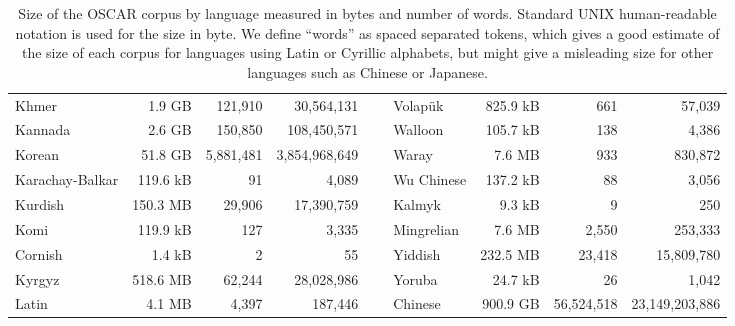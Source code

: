 \begin{table}[ht!]
{\begin{tabular}{lrrrclrrr}
            Khmer                       & 1.9 GB    & 121,910     & 30,564,131      & ~ & Volapük           & 825.9 kB  & 661        & 57,039         \\
            Kannada                     & 2.6 GB    & 150,850     & 108,450,571     & ~ & Walloon           & 105.7 kB  & 138        & 4,386          \\
            Korean                      & 51.8 GB   & 5,881,481   & 3,854,968,649   & ~ & Waray             & 7.6 MB    & 933        & 830,872        \\
            Karachay-Balkar             & 119.6 kB  & 91          & 4,089           & ~ & Wu Chinese        & 137.2 kB  & 88         & 3,056          \\
            Kurdish                     & 150.3 MB  & 29,906      & 17,390,759      & ~ & Kalmyk            & 9.3 kB    & 9          & 250            \\
            Komi                        & 119.9 kB  & 127         & 3,335           & ~ & Mingrelian        & 7.6 MB    & 2,550      & 253,333        \\
            Cornish                     & 1.4 kB    & 2           & 55              & ~ & Yiddish           & 232.5 MB  & 23,418     & 15,809,780     \\
            Kyrgyz                      & 518.6 MB  & 62,244      & 28,028,986      & ~ & Yoruba            & 24.7 kB   & 26         & 1,042          \\
            Latin                       & 4.1 MB    & 4,397       & 187,446         & ~ & Chinese           & 900.9 GB  & 56,524,518 & 23,149,203,886 \\
            \bottomrule
        \end{tabular}
    }
    \caption{Size of the OSCAR corpus by language measured in bytes and number of words. Standard UNIX human-readable notation is used for the size in byte. We define ``words'' as spaced separated tokens, which gives a good estimate of the size of each corpus for languages using Latin or Cyrillic alphabets, but might give a misleading size for other languages such as Chinese or Japanese.}
    \label{tab:langs_towards}
\end{table}